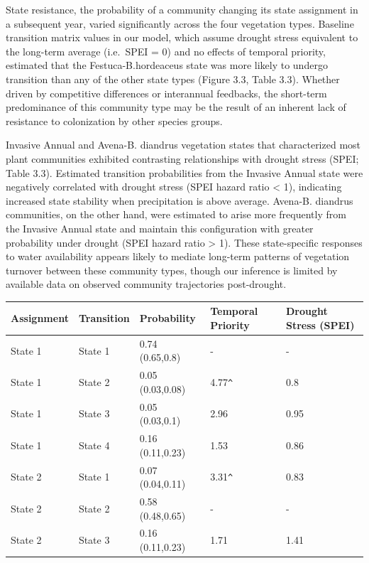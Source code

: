\documentclass[twoside,12pt,final]{ucthesis-CA2012}
\begin{document}
\begin{ucmainmatter}
\begin{figure}
\end{figure}
State resistance, the probability of a community changing its state assignment in a subsequent year, varied significantly across the four vegetation types.
Baseline transition matrix values in our model, which assume drought stress equivalent to the long-term average (i.e.~SPEI = 0) and no effects of temporal priority, estimated that the Festuca-B.hordeaceus state was more likely to undergo transition than any of the other state types (Figure 3.3, Table 3.3).
Whether driven by competitive differences or interannual feedbacks, the short-term predominance of this community type may be the result of an inherent lack of resistance to colonization by other species groups.

Invasive Annual and Avena-B. diandrus vegetation states that characterized most plant communities exhibited contrasting relationships with drought stress (SPEI; Table 3.3).
Estimated transition probabilities from the Invasive Annual state were negatively correlated with drought stress (SPEI hazard ratio \textless{} 1), indicating increased state stability when precipitation is above average.
Avena-B. diandrus communities, on the other hand, were estimated to arise more frequently from the Invasive Annual state and maintain this configuration with greater probability under drought (SPEI hazard ratio \textgreater{} 1).
These state-specific responses to water availability appears likely to mediate long-term patterns of vegetation turnover between these community types, though our inference is limited by available data on observed community trajectories post-drought.
\begin{table}[ht]
\centering
\begin{tabular}{lllll}
  \hline
Assignment & Transition & Probability & Temporal Priority & Drought Stress (SPEI) \\ 
  \hline
State 1 & State 1 & 0.74 (0.65,0.8) & - & - \\ 
  State 1 & State 2 & 0.05 (0.03,0.08) & 4.77\verb|^| & 0.8 \\ 
  State 1 & State 3 & 0.05 (0.03,0.1) & 2.96 & 0.95 \\ 
  State 1 & State 4 & 0.16 (0.11,0.23) & 1.53 & 0.86 \\ 
  State 2 & State 1 & 0.07 (0.04,0.11) & 3.31\verb|^| & 0.83 \\ 
  State 2 & State 2 & 0.58 (0.48,0.65) & - & - \\ 
  State 2 & State 3 & 0.16 (0.11,0.23) & 1.71 & 1.41 \\ 

\end{tabular}
\end{table}
\end{ucmainmatter}
\end{document}
